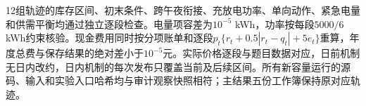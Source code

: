 12组轨迹的库存区间、初末条件、跨午夜衔接、充放电功率、单向动作、紧急电量和供需平衡均通过独立逐段检查。电量项容差为$10^{-5}$ kWh，功率按每段$5000/6$ kWh约束核验。现金费用同时按分项账单和逐段$p_t\{r_t+0.5|r_t-q_t|+5e_t\}$重算，年度总费与保存结果的绝对差小于$10^{-5}$元。实际价格逐段与题目数据对应，日前机制无日内改约，日内机制的每次发布只覆盖当前及后续区间。所有新容量运行的源码、输入和实验入口哈希均与审计观察快照相符；主结果五份工作簿保持原对应轨迹。

